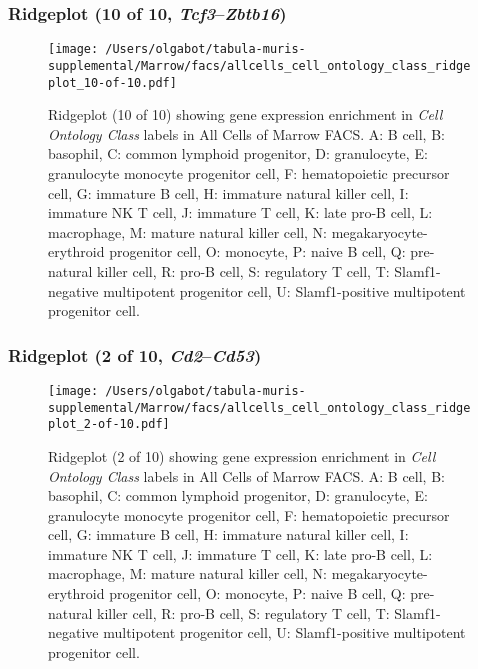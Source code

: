 \clearpage

\subsubsection{Ridgeplot (10 of 10, \emph{Tcf3}--\emph{Zbtb16})}
\begin{figure}[h]
\centering
\texttt{[image: /Users/olgabot/tabula-muris-supplemental/Marrow/facs/allcells\_cell\_ontology\_class\_ridgeplot\_10-of-10.pdf]}

\caption{ Ridgeplot (10 of 10)  showing gene expression enrichment in \emph{Cell Ontology Class} labels in All Cells of Marrow FACS. A: B cell, B: basophil, C: common lymphoid progenitor, D: granulocyte, E: granulocyte monocyte progenitor cell, F: hematopoietic precursor cell, G: immature B cell, H: immature natural killer cell, I: immature NK T cell, J: immature T cell, K: late pro-B cell, L: macrophage, M: mature natural killer cell, N: megakaryocyte-erythroid progenitor cell, O: monocyte, P: naive B cell, Q: pre-natural killer cell, R: pro-B cell, S: regulatory T cell, T: Slamf1-negative multipotent progenitor cell, U: Slamf1-positive multipotent progenitor cell.}
\end{figure}


\clearpage

\subsubsection{Ridgeplot (2 of 10, \emph{Cd2}--\emph{Cd53})}
\begin{figure}[h]
\centering
\texttt{[image: /Users/olgabot/tabula-muris-supplemental/Marrow/facs/allcells\_cell\_ontology\_class\_ridgeplot\_2-of-10.pdf]}

\caption{ Ridgeplot (2 of 10)  showing gene expression enrichment in \emph{Cell Ontology Class} labels in All Cells of Marrow FACS. A: B cell, B: basophil, C: common lymphoid progenitor, D: granulocyte, E: granulocyte monocyte progenitor cell, F: hematopoietic precursor cell, G: immature B cell, H: immature natural killer cell, I: immature NK T cell, J: immature T cell, K: late pro-B cell, L: macrophage, M: mature natural killer cell, N: megakaryocyte-erythroid progenitor cell, O: monocyte, P: naive B cell, Q: pre-natural killer cell, R: pro-B cell, S: regulatory T cell, T: Slamf1-negative multipotent progenitor cell, U: Slamf1-positive multipotent progenitor cell.}
\end{figure}


\clearpage

